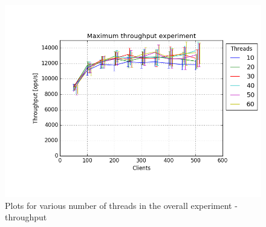 \documentclass[11pt]{article}
\begin{document}
\begin{figure}
\centering
\includegraphics[width=0.95\linewidth]{plots/max_throughput_all_overall}
\caption{Plots for various number of threads in the overall experiment - throughput}
\label{fig:max-throughput-overall-throughput}
\end{figure}
\end{document}
